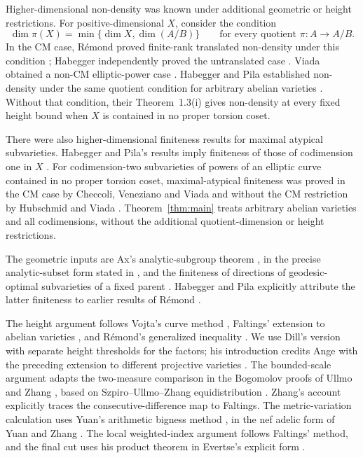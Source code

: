 Higher-dimensional non-density was known under additional geometric
or height restrictions. For positive-dimensional $X$, consider the
condition
\[
 \dim\pi(X)=\min\{\dim X,\dim(A/B)\}
 \qquad\text{for every quotient }\pi:A\longrightarrow A/B.
\]
In the CM case, R\'emond proved finite-rank translated non-density under
this condition \cite[Theorem~1.3]{Remond2009}; Habegger independently
proved the untranslated case \cite[Corollary~2]{Habegger2009}.
Viada obtained a non-CM elliptic-power case
\cite[Theorem~1.3]{Viada2009}. Habegger and Pila established
non-density under the same quotient condition for arbitrary abelian
varieties \cite[Theorem~1.3(ii)]{HabeggerPila2016}. Without that condition,
their Theorem~1.3(i) gives non-density at every fixed height bound when
$X$ is contained in no proper torsion coset.

There were also higher-dimensional finiteness results for maximal
atypical subvarieties. Habegger and Pila's results imply finiteness of
those of codimension one in $X$
\cite[Theorem~9.14(i)]{HabeggerPila2016}. For codimension-two
subvarieties of powers of an elliptic curve contained in no proper
torsion coset, maximal-atypical finiteness was proved in the CM case by
Checcoli, Veneziano and Viada \cite[Corollary~1.5]{CheccoliVenezianoViada2014}
and without the CM restriction by Hubschmid and Viada
\cite[Theorem~1.1]{HubschmidViada2019}.
Theorem~\ref{thm:main} treats arbitrary abelian varieties and all
codimensions, without the additional quotient-dimension or height
restrictions.

The geometric inputs are Ax's analytic-subgroup theorem
\cite{Ax1972}, in the precise analytic-subset form stated in
\cite[Theorem~5.3]{HabeggerPila2016}, and the finiteness of directions of
geodesic-optimal subvarieties of a fixed parent
\cite[Proposition~6.1]{HabeggerPila2016}.
Habegger and Pila explicitly attribute the latter finiteness to earlier
results of R\'emond \cite[Lemma~2.6 and Proposition~3.2]{Remond2009}.

The height argument follows Vojta's curve method \cite{Vojta1991},
Faltings' extension to abelian varieties \cite{Faltings1991}, and
R\'emond's generalized inequality \cite{Remond2005Vojta}. We use Dill's
version with separate height thresholds for the factors; his introduction
credits Ange with the preceding extension to different projective
varieties \cite{Dill2020}.
The bounded-scale argument adapts the two-measure comparison in the
Bogomolov proofs of Ullmo and Zhang \cite{Ullmo1998,Zhang1998}, based
on Szpiro--Ullmo--Zhang equidistribution \cite{SzpiroUllmoZhang1997}.
Zhang's account \cite[Section~3]{Zhang1998ICM} explicitly traces the
consecutive-difference map to Faltings. The metric-variation calculation
uses Yuan's arithmetic bigness method \cite{Yuan2008}, in the nef adelic
form of Yuan and Zhang \cite{YuanZhang2021}. The local weighted-index
argument follows Faltings' method, and the final cut uses his product
theorem in Evertse's explicit form \cite{Evertse1995Product}.

